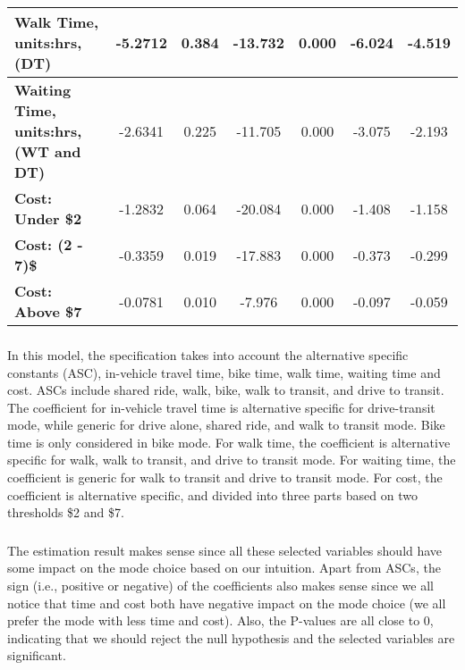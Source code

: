 \documentclass[11pt]{article}
\begin{document}
\begin{table}[H]
\begin{tabular}{|>{\raggedleft}m{6cm}|c|c|c|c|c|c|}
\textbf{Walk Time, units:hrs, (DT)}                     &      -5.2712  &        0.384     &   -13.732  &         0.000        &       -6.024    &       -4.519     \\\hline 
\textbf{Waiting Time, \\units:hrs, (WT and DT)}           &      -2.6341  &        0.225     &   -11.705  &         0.000        &       -3.075    &       -2.193     \\\hline 
\textbf{Cost: Under \$2}                                &      -1.2832  &        0.064     &   -20.084  &         0.000        &       -1.408    &       -1.158     \\\hline 
\textbf{Cost: (2 - 7)\$}                                &      -0.3359  &        0.019     &   -17.883  &         0.000        &       -0.373    &       -0.299     \\\hline 
\textbf{Cost: Above \$7}                                &      -0.0781  &        0.010     &    -7.976  &         0.000        &       -0.097    &       -0.059   \\\hline 
\end{tabular}
\end{table}
\newpage
\subsubsection{}
In this model, the specification takes into account the alternative specific constants (ASC), in-vehicle travel time, bike time, walk time, waiting time and cost. ASCs include shared ride, walk, bike, walk to transit, and drive to transit. The coefficient for in-vehicle travel time is alternative specific for drive-transit mode, while generic for drive alone, shared ride, and walk to transit mode. Bike time is only considered in bike mode. For walk time, the coefficient is alternative specific for walk, walk to transit, and drive to transit mode. For waiting time, the coefficient is generic for walk to transit and drive to transit mode. For cost, the coefficient is alternative specific, and divided into three parts based on two thresholds \$2 and \$7.
\subsubsection{}
The estimation result makes sense since all these selected variables should have some impact on the mode choice based on our intuition. Apart from ASCs, the sign (i.e., positive or negative) of the coefficients also makes sense since we all notice that time and cost both have negative impact on the mode choice (we all prefer the mode with less time and cost). Also, the P-values are all close to 0, indicating that we should reject the null hypothesis and the selected variables are significant.
\end{document}
